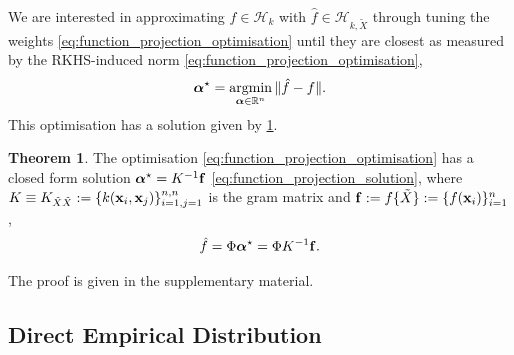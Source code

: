 \documentclass[twoside]{article} \usepackage{aistats2017}
\theoremstyle{definition}
\theoremstyle{theorem}
\newtheorem{theorem}{Theorem}[section]
\newcommand{\argmin}{\operatornamewithlimits{argmin}}
\newcommand{\ds}[1]{\tilde{#1}}
\begin{document}
		We are interested in approximating $f \in \mathcal{H}_{k}$ with $\hat{f} \in \mathcal{H}_{k, \ds{X}}$ through tuning the weights \eqref{eq:function_projection_optimisation} until they are closest as measured by the RKHS-induced norm \eqref{eq:function_projection_optimisation},
		\begin{equation}
			\bm{\alpha}^{\star} = \argmin_{\bm{\alpha} \in \mathbb{R}^{n}} \Vert \hat{f} - f \Vert.
		\label{eq:function_projection_optimisation}
		\end{equation}
		This optimisation has a solution given by \cref{thm:function_projection_solution}.
		\begin{theorem} \label{thm:function_projection_solution}
			The optimisation \eqref{eq:function_projection_optimisation} has a closed form solution $\bm{\alpha}^{\star} = K^{-1} \mathbf{f}$ \eqref{eq:function_projection_solution}, where $K \equiv K_{\ds{X} \ds{X}} := \{k(\bvec{x}_{i}, \bvec{x}_{j})\}_{i = 1, j = 1}^{n, n}$ is the gram matrix and $\bvec{f} := f\{\ds{X}\} := \{f(\bvec{x}_{i})\}_{i = 1}^{n}$,
			\begin{equation}
				\hat{f} = \Phi \bm{\alpha}^{\star} = \Phi K^{-1} \mathbf{f}.
			\label{eq:function_projection_solution}
			\end{equation}
		\end{theorem}
		The proof is given in the supplementary material.

	\subsection{Direct Empirical Distribution}
	\label{sec:direct_quantile_regression:optimal_empirical_distribution}
	
\end{document}
